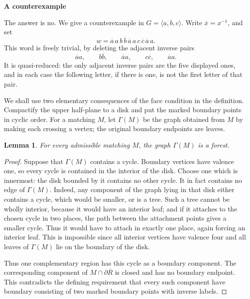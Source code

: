 \documentclass[12pt]{article}
\newtheorem{lemma}{Lemma}
\newcommand{\ol}{\overline}
\begin{document}
\date{}


\begin{center}
\textbf{A counterexample}
\end{center}

The answer is no.  We give a counterexample in
\(G=\langle a,b,c\rangle\).  Write \(\ol x=x^{-1}\), and set
\[
        w=\ol a\,a\, b\,\ol b\,\ol a\,a\, c\,\ol c\,\ol a\,a .
\]
This word is freely trivial, by deleting the adjacent inverse pairs
\[
        \ol a a,\qquad b\ol b,\qquad \ol a a,\qquad c\ol c,\qquad
        \ol a a .
\]
It is quasi-reduced: the only adjacent inverse pairs are the five
displayed ones, and in each case the following letter, if there is one,
is not the first letter of that pair.

We shall use two elementary consequences of the face condition in the
definition.  Compactify the upper half-plane to a disk and put the
marked boundary points in cyclic order.  For a matching \(M\), let
\(\Gamma(M)\) be the graph obtained from \(M\) by making each crossing a
vertex; the original boundary endpoints are leaves.

\begin{lemma}
For every admissible matching \(M\), the graph \(\Gamma(M)\) is a
forest.
\end{lemma}

\begin{proof}
Suppose that \(\Gamma(M)\) contains a cycle.  Boundary vertices have
valence one, so every cycle is contained in the interior of the disk.
Choose one which is innermost: the disk bounded by it contains no other
cycle.  It in fact contains no edge of \(\Gamma(M)\).  Indeed, any
component of the graph lying in that disk either contains a cycle, which
would be smaller, or is a tree.  Such a tree cannot be wholly interior,
because it would have an interior leaf; and if it attaches to the chosen
cycle in two places, the path between the attachment points gives a
smaller cycle.  Thus it would have to attach in exactly one place, again
forcing an interior leaf.  This is impossible since all interior vertices
have valence four and all leaves of \(\Gamma(M)\) lie on the boundary of
the disk.

Thus one complementary region has this cycle as a boundary component.
The corresponding component of
\(M\cap\partial\overline R\) is closed and has no boundary endpoint.
This contradicts the defining requirement that every such component
have boundary consisting of two marked boundary points with inverse
labels.
\end{proof}
\end{document}
